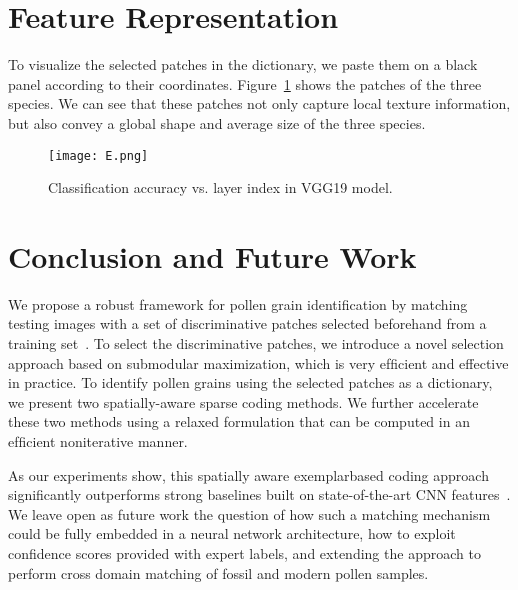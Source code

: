 \documentclass[10pt,twocolumn,letterpaper]{article}
\begin{document}
\section{Feature Representation}

To visualize the selected patches in the dictionary, we paste them on a black panel according to their coordinates. Figure~\ref{fig:1} shows the patches of the three species. We can see that these patches not only capture local texture information, but also convey a global shape and average size of the three species.
\begin{figure}
\begin{center}
\texttt{[image: E.png]}
\end{center}
\caption{ Classiﬁcation accuracy vs. layer index in VGG19 model.}
\label{fig:1}
\end{figure}
\section{Conclusion and Future Work}

We propose a robust framework for pollen grain identiﬁcation by matching testing images with a set of discriminative patches selected beforehand from a training set~\cite{horn1981determining}. To select the discriminative patches, we introduce a novel selection approach based on submodular maximization, which is very efﬁcient and effective in practice. To identify pollen grains using the selected patches as a dictionary, we present two spatially-aware sparse coding methods. We further accelerate these two methods using a relaxed formulation that can be computed in an efﬁcient noniterative manner.


As our experiments show, this spatially aware exemplarbased coding approach signiﬁcantly outperforms strong baselines built on state-of-the-art CNN features~\cite{Kong_2016_CVPR_Workshops}. We leave open as future work the question of how such a matching mechanism could be fully embedded in a neural network architecture, how to exploit conﬁdence scores provided with expert labels, and extending the approach to perform cross domain matching of fossil and modern pollen samples.




{\small


}
\end{document}
